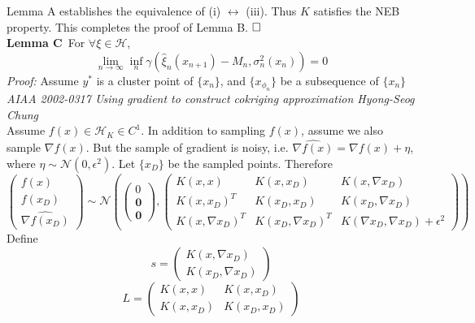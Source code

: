 \documentclass[a4paper,onecolumn]{article}
\begin{document}
\noindent Lemma A establishes the equivalence of (i) $\leftrightarrow$ (iii). Thus $K$ satisfies the NEB property. This completes the proof of Lemma B. $\hfill \Box$\\

\noindent \textbf{Lemma C}$\,$ For $\forall \xi\in \mathcal{H}$, $$\lim_{n\rightarrow \infty }\inf_n \gamma(\hat{\xi}_n(x_{n+1}) - M_n, \sigma^2_n(x_n)) = 0$$
\emph{Proof:} Assume $y^*$ is a cluster point of $\{x_n\}$, and $\{x_{\phi_n}\}$ be a subsequence of $\{x_n\}$\\

\noindent \emph{AIAA 2002-0317 Using gradient to construct cokriging approximation Hyong-Seog Chung}\\

\noindent Assume $f(x)\in\mathcal{H}_K \in C^1$. In addition to sampling $f(x)$, assume we also sample $\nabla f(x)$. But the sample
of gradient is noisy, i.e. $\widehat{\nabla f(x)} = \nabla f(x) + \eta$, where $\eta \sim \mathcal{N}(0, \epsilon^2)$. Let $\{x_D\}$ be the sampled points.
Therefore
\begin{equation*}
    \begin{pmatrix}
        f(x)\\
        f(x_D)\\
        \widehat{\nabla f(x_D)}
    \end{pmatrix}
    \sim
    \mathcal{N}
    \left(
        \begin{pmatrix}
            0 \\
            \mathbf{0}\\
            \mathbf{0}
        \end{pmatrix}
        ,
        \begin{pmatrix}
            K(x,x) & K(x,x_D) & K(x, \nabla x_D)\\
            K(x,x_D)^T & K(x_D, x_D) & K(x_D, \nabla x_D)\\
            K(x,\nabla x_D)^T & K(x_D, \nabla x_D)^T & K(\nabla x_D, \nabla x_D)+ \epsilon^2
        \end{pmatrix}
    \right)
\end{equation*}
Define 
\begin{equation*}
    s = \begin{pmatrix}
        K(x, \nabla x_D)\\
        K(x_D, \nabla x_D)
    \end{pmatrix}
\end{equation*}
\begin{equation*}
    L = \begin{pmatrix}
        K(x,x) & K(x,x_D)\\
        K(x,x_D) & K(x_D, x_D)
    \end{pmatrix}
\end{equation*}
\end{document}
